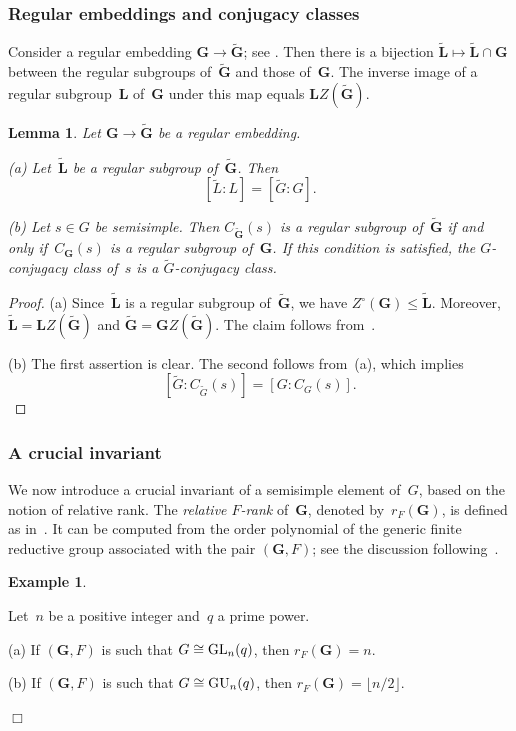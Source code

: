 \documentclass[12pt]{amsart}
\newcommand{\bG}{{\mathbf{G}}}      %
\newcommand{\bL}{{\mathbf{L}}}
\def\GL{ \text{\rm GL} }
\def\GU{ \text{\rm GU} }
\newtheorem{lem}[thm]{Lemma}
\theoremstyle{theorem}
\theoremstyle{definition}
\newtheorem{exmp}[thm]{Example}
\theoremstyle{remark}
\begin{document}
\subsubsection{Regular embeddings and conjugacy classes}
Consider a regular embedding $\bG \rightarrow \tilde{\bG}$; see
\cite[Definition~$1.7.1$]{GeMa}. Then there is a bijection 
$\tilde{\bL} \mapsto \tilde{\bL} \cap \bG$ between the regular subgroups 
of~$\tilde{\bG}$ and those of~$\bG$. The inverse image of a regular 
subgroup~$\bL$ of~$\bG$ under this map equals $\bL Z( \tilde{\bG} )$.

\addtocounter{thm}{2}
\begin{lem}
\label{RegularEmbeddingsAndConjugacyClasses}
Let $\bG \rightarrow \tilde{\bG}$ be a regular embedding.

{\rm (a)} Let~$\tilde{\bL}$ be a regular subgroup of~$\tilde{\bG}$.
Then 
$$[\tilde{L}\colon\!L] = [\tilde{G}\colon\!G].$$

{\rm (b)} Let $s \in G$ be semisimple. Then $C_{\tilde{\bG}}( s )$ is a regular
subgroup of~$\tilde{\bG}$ if and only if~$C_{\bG}( s )$ is a regular subgroup 
of~$\bG$. If this condition is satisfied, the $G$-conjugacy class of~$s$ is a
$\tilde{G}$-conjugacy class.
\end{lem}
\begin{proof}
(a) Since~$\tilde{\bL}$ is a regular subgroup of~$\tilde{\bG}$, we have
$Z^{\circ}( \bG ) \leq \tilde{\bL}$. Moreover, 
$\tilde{\bL} = \bL Z( \tilde{\bG} )$ and $\tilde{\bG} = \bG Z( \tilde{\bG} )$. 
The claim follows from~\cite[Lemma~$1.7.8$]{GeMa}. 

(b) The first assertion is clear. The second follows from~(a), which implies
$$[\tilde{G}\colon\!C_{\tilde{G}}( s )] = [G\colon\!C_{G}( s )].$$
\end{proof}

\addtocounter{subsubsection}{1}
\subsubsection{A crucial invariant}
We now introduce a crucial invariant of a semisimple element of~$G$, based on 
the notion of relative rank.
The \textit{relative $F$-rank} of~$\mathbf{G}$, denoted by~$r_F( \mathbf{G} )$,
is defined as in~\cite[Definition~$7.1.5$]{DiMi2}. It can be computed from the 
order polynomial of the generic finite reductive group associated with the pair 
$(\mathbf{G}, F )$; see the discussion 
following~\cite[Definition~$2.2.11$]{GeMa}. 

\addtocounter{thm}{1}
\begin{exmp}
\label{OmegaOfGLNQ}
{\rm
Let~$n$ be a positive integer and~$q$ a prime power.

(a) If $(\mathbf{G}, F)$ is such that $G \cong \GL_n( q )$, 
then $r_F( \mathbf{G} ) = n$.

(b) If $(\mathbf{G}, F)$ is such that $G \cong \GU_n( q )$, 
then $r_F( \mathbf{G} ) = \lfloor n/2 \rfloor$.
}\hfill{$\Box$}
\end{exmp}
\end{document}
